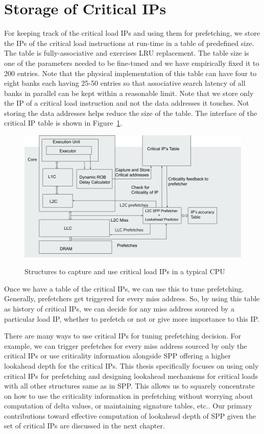 \section{Storage of Critical IPs}

For keeping track of the critical load IPs and using them for prefetching, we store the IPs of the critical load instructions at run-time in a table  of predefined size. The table is fully-associative and exercises LRU replacement.
The table size is one of the parameters needed to be fine-tuned and we have empirically fixed it to 200 entries. Note that the physical implementation of this table can have four to eight banks each having 25-50 entries so that associative search latency of all banks in parallel can be kept within a reasonable limit. Note that we store only the IP of a critical load instruction and not the data addresses it touches.
Not storing the data addresses helps reduce the size of the table.
The interface of the critical IP table is shown in Figure~\ref{fig:criticaliptable}.
\begin{figure}[H]
{\includegraphics[scale=0.4]{images/Block.png}}\par\medskip
\caption{Structures to capture and use critical load IPs in a typical CPU}
\label{fig:criticaliptable}
\end{figure}

Once we have a table of the critical IPs, we can use this to tune prefetching. Generally, prefetchers get triggered for every miss address. So, by using this table as history of critical IPs, we can decide for any miss address sourced by a particular load IP, whether to prefetch or not or give more importance to this IP.

There are many ways to use critical IPs for tuning prefetching decision. For example, we can trigger prefetches for every miss address sourced by only the critical IPs or use criticality information alongside SPP offering a higher lookahead depth for the critical IPs. This thesis specifically focuses on using only critical IPs for prefetching and designing lookahead mechanisms for critical loads with all other structures same as in SPP. This allows us to squarely concentrate on how to use the criticality information in prefetching without worrying about computation of delta values, or maintaining signature tables, etc.. Our primary contributions toward effective computation of
lookahead depth of SPP given the set of critical IPs are discussed in the next chapter.

